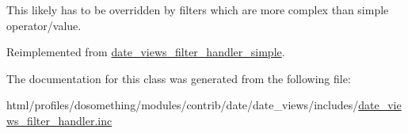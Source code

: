 This likely has to be overridden by filters which are more complex than simple operator/value. 

Reimplemented from \hyperlink{classdate__views__filter__handler__simple_ad88e187cbc6c8f5a48f4ad9daf83fff8}{date\_\-views\_\-filter\_\-handler\_\-simple}.

The documentation for this class was generated from the following file:\begin{DoxyCompactItemize}
\item 
html/profiles/dosomething/modules/contrib/date/date\_\-views/includes/\hyperlink{date__views__filter__handler_8inc}{date\_\-views\_\-filter\_\-handler.inc}\end{DoxyCompactItemize}
